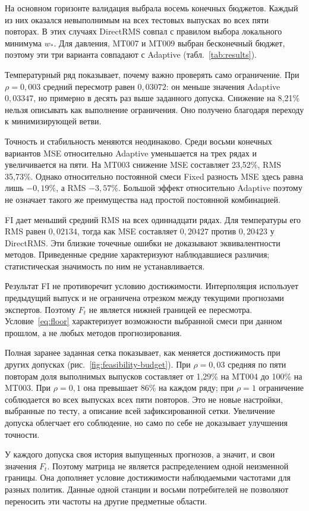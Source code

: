 \documentclass{misisarticle}
\begin{document}
На основном горизонте валидация выбрала восемь конечных бюджетов. Каждый из них оказался невыполнимым на всех тестовых выпусках во всех пяти повторах. В этих случаях DirectRMS совпал с правилом выбора локального минимума $w_*$. Для давления, MT007 и MT009 выбран бесконечный бюджет, поэтому эти три варианта совпадают с Adaptive (табл.~\ref{tab:results}).

Температурный ряд показывает, почему важно проверять само ограничение. При $\rho=0{,}003$ средний пересмотр равен $0{,}03072$: он меньше значения Adaptive $0{,}03347$, но примерно в десять раз выше заданного допуска. Снижение на 8,21\% нельзя описывать как выполнение ограничения. Оно получено благодаря переходу к минимизирующей ветви.

Точность и стабильность меняются неодинаково. Среди восьми конечных вариантов MSE относительно Adaptive уменьшается на трех рядах и увеличивается на пяти. На MT003 снижение MSE составляет 23,52\%, RMS 35,73\%. Однако относительно постоянной смеси Fixed разность MSE здесь равна лишь $-0{,}19\%$, а RMS $-3{,}57\%$. Большой эффект относительно Adaptive поэтому не означает такого же преимущества над простой постоянной комбинацией.

FI дает меньший средний RMS на всех одиннадцати рядах. Для температуры его RMS равен $0{,}02134$, тогда как MSE составляет $0{,}20427$ против $0{,}20423$ у DirectRMS. Эти близкие точечные ошибки не доказывают эквивалентности методов. Приведенные средние характеризуют наблюдавшиеся различия; статистическая значимость по ним не устанавливается.

Результат FI не противоречит условию достижимости. Интерполяция использует предыдущий выпуск и не ограничена отрезком между текущими прогнозами экспертов. Поэтому $F_t$ не является нижней границей ее пересмотра. Условие~\eqref{eq:floor} характеризует возможности выбранной смеси при данном прошлом, а не любых методов прогнозирования.

Полная заранее заданная сетка показывает, как меняется достижимость при других допусках (рис.~\ref{fig:feasibility-budget}). При $\rho=0{,}03$ средняя по пяти повторам доля выполнимых выпусков составляет от 1,29\% на MT004 до 100\% на MT003. При $\rho=0{,}1$ она превышает 86\% на каждом ряду; при $\rho=1$ ограничение соблюдается во всех выпусках всех пяти повторов. Это не новые настройки, выбранные по тесту, а описание всей зафиксированной сетки. Увеличение допуска облегчает его соблюдение, но само по себе не доказывает улучшения точности.

У каждого допуска своя история выпущенных прогнозов, а значит, и свои значения $F_t$. Поэтому матрица не является распределением одной неизменной границы. Она дополняет условие достижимости наблюдаемыми частотами для разных политик. Данные одной станции и восьми потребителей не позволяют переносить эти частоты на другие предметные области.
\end{document}
